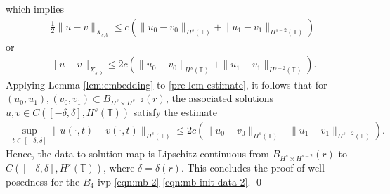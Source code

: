 \documentclass[12pt,reqno]{amsart}
\numberwithin{equation}{section}  %
\newcommand{\rr}{\mathbb{R}}
\newcommand{\ci}{\mathbb{T}}
\newtheorem{definition}[theorem]{Definition}
\begin{document}
%
%
which implies
%
%
\begin{equation*}
	\begin{split}
		\frac{1}{2} \|u-v\|_{X_{s,b}} \le
    c \left( \|u_0 -v_0 \|_{H^s\left( \ci \right)} +\|u_1 -v_1
        \|_{H^{s-2}\left( \ci \right)} \right )
      \end{split}
\end{equation*}
%
%
or
%
%
\begin{equation}
	\begin{split}
		\|u -v \|_{X_{s,b}} \le 2 c \left( \|u_0 -v_0 \|_{H^s\left( \ci \right)} +\|u_1 -v_1
        \|_{H^{s-2}\left( \ci \right)} \right ).
	\end{split}
  \label{pre-lem-estimate}
\end{equation}
%
%
Applying Lemma \ref{lem:embedding} to \eqref{pre-lem-estimate}, it follows that
for $(u_0, u_1), (v_0, v_1)  \subset
B_{H^{s} \times H^{s-2}} \left (r \right )$, the
associated solutions $u, v \in C([-\delta, \delta], H^{s}(\ci))$ satisfy the estimate%
%
%
	 \begin{equation*}
		 \begin{split}
       \sup_{t \in [-\delta, \delta]} \|u(\cdot, t) -v(\cdot, t) \|_{H^s(\ci)} \le
      2 c \left( \|u_0 -v_0 \|_{H^s\left( \ci \right)} +\|u_1 -v_1
        \|_{H^{s-2}\left( \ci \right)} \right ).
		 \end{split}
	 \end{equation*}
Hence, the data to solution map is Lipschitz continuous from $B_{H^{s}
\times H^{s-2}} \left (r \right )$ to $C([-\delta, \delta],
H^{s}(\ci))$, where $\delta = \delta(r)$. This
concludes the proof of well-posedness for the $B_4$ ivp
\eqref{eqn:mb-2}-\eqref{eqn:mb-init-data-2}. \qed %
%
%
%
%
%
%
\end{document}
